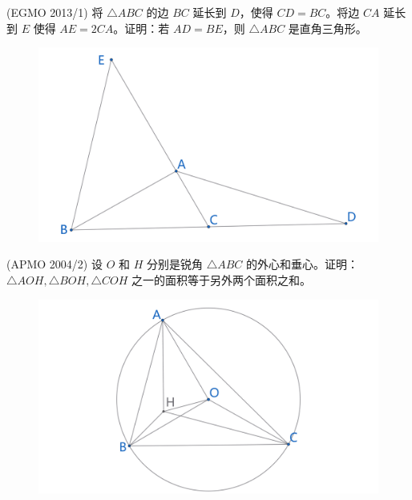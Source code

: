 \newpage 
\begin{exercise}
    (EGMO 2013/1) 将 $\triangle ABC$ 的边 ${BC}$ 延长到 $D$，使得 $CD = BC$。将边 ${CA}$ 延长到 $E$ 使得 $AE = 2CA$。证明：若 $AD = BE$，则 $\triangle ABC$ 是直角三角形。
\end{exercise}
\begin{figure}[H]
    \centering
    \includegraphics[width=0.7\linewidth]{figures/exercises/326.png}
\end{figure}

\begin{exercise}
    (APMO 2004/2) 设 $O$ 和 $H$ 分别是锐角 $\triangle ABC$ 的外心和垂心。证明：$\triangle AOH, \triangle BOH, \triangle COH$ 之一的面积等于另外两个面积之和。
\end{exercise}
\begin{figure}[H]
    \centering
    \includegraphics[width=0.7\linewidth]{figures/exercises/327.png}
\end{figure}


